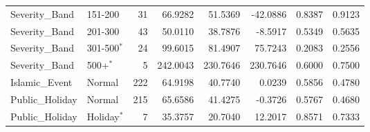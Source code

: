 {\begin{longtable}{@{}llrrrrrr@{}}
Severity\_Band & 151-200 & 31 & 66.9282 & 51.5369 & -42.0886 & 0.8387 & 0.9123 \\
Severity\_Band & 201-300 & 43 & 50.0110 & 38.7876 & -8.5917 & 0.5349 & 0.5635 \\
Severity\_Band & 301-500$^{*}$ & 24 & 99.6015 & 81.4907 & 75.7243 & 0.2083 & 0.2556 \\
Severity\_Band & 500+$^{*}$ & 5 & 242.0043 & 230.7646 & 230.7646 & 0.6000 & 0.7500 \\
Islamic\_Event & Normal & 222 & 64.9198 & 40.7740 & 0.0239 & 0.5856 & 0.4780 \\
Public\_Holiday & Normal & 215 & 65.6586 & 41.4275 & -0.3726 & 0.5767 & 0.4680 \\
Public\_Holiday & Holiday$^{*}$ & 7 & 35.3757 & 20.7040 & 12.2017 & 0.8571 & 0.7333 \\
\bottomrule
\end{longtable}
}
